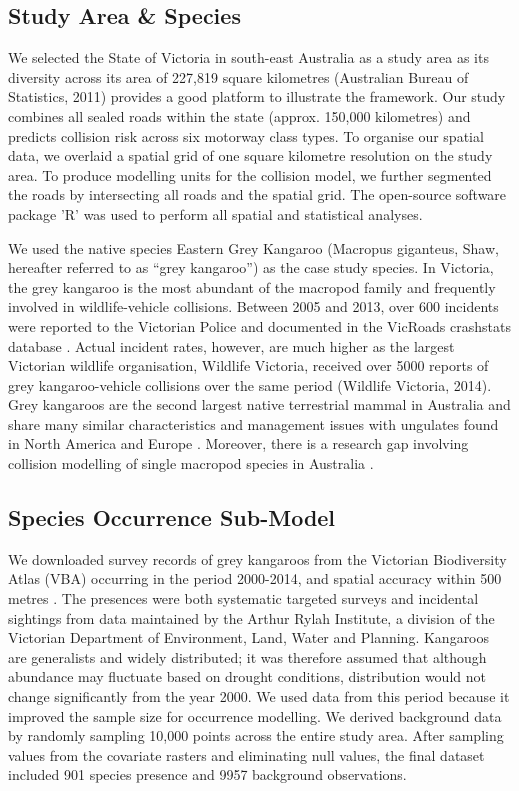 \subsection{Study Area \& Species}

We selected the State of Victoria in south-east Australia as a study area as its diversity across its area of 227,819 square kilometres (Australian Bureau of Statistics, 2011) provides a good platform to illustrate the framework. Our study combines all sealed roads within the state (approx. 150,000 kilometres) and predicts collision risk across six motorway class types. To organise our spatial data, we overlaid a spatial grid of one square kilometre resolution on the study area. To produce modelling units for the collision model, we further segmented the roads by intersecting all roads and the spatial grid. The open-source software package ’R’ \citep{rdct16} was used to perform all spatial and statistical analyses.

We used the native species Eastern Grey Kangaroo (Macropus giganteus, Shaw, hereafter referred to as “grey kangaroo”) as the case study species. In Victoria, the grey kangaroo is the most abundant of the macropod family and frequently involved in wildlife-vehicle collisions. Between 2005 and 2013, over 600 incidents were reported to the Victorian Police and documented in the VicRoads crashstats database \citep{vicr09}. Actual incident rates, however, are much higher as the largest Victorian wildlife organisation, Wildlife Victoria, received over 5000 reports of grey kangaroo-vehicle collisions over the same period (Wildlife Victoria, 2014). Grey kangaroos are the second largest native terrestrial mammal in Australia and share many similar characteristics and management issues with ungulates found in North America and Europe \citep{crof04,coul10}. Moreover, there is a research gap involving collision modelling of single macropod species in Australia \citep{bond14}.

\subsection{Species Occurrence Sub-Model}

We downloaded survey records of grey kangaroos from the Victorian Biodiversity Atlas (VBA) occurring in the period 2000-2014, and spatial accuracy within 500 metres \citep{depi16}. The presences were both systematic targeted surveys and incidental sightings from data maintained by the Arthur Rylah Institute, a division of the Victorian Department of Environment, Land, Water and Planning.  Kangaroos are generalists and widely distributed; it was therefore assumed that although abundance may fluctuate based on drought conditions, distribution would not change significantly from the year 2000.  We used data from this period because it improved the sample size for occurrence modelling.  We derived background data by randomly sampling 10,000 points across the entire study area.  After sampling values from the covariate rasters and eliminating null values, the final dataset included 901 species presence and 9957 background observations.

